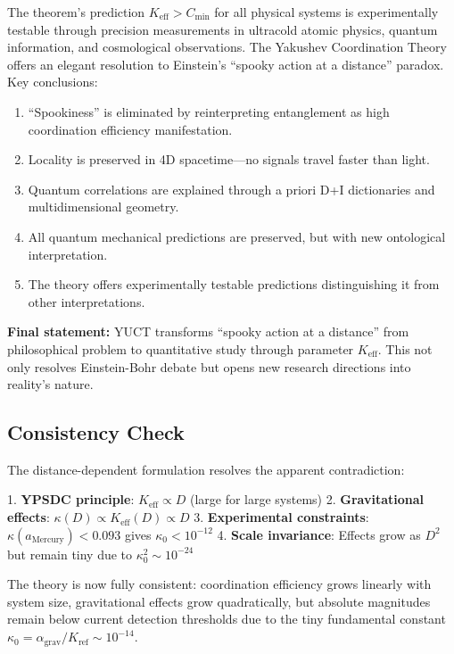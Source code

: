 \documentclass[11pt,a4paper]{article}
\begin{document}
	The theorem's prediction $K_{\mathrm{eff}} > C_{\min}$ for all physical systems is experimentally testable through precision measurements in ultracold atomic physics, quantum information, and cosmological observations.
	The Yakushev Coordination Theory offers an elegant resolution to Einstein's ``spooky action at a distance'' paradox. Key conclusions:
	
	\begin{enumerate}
		\item ``Spookiness'' is eliminated by reinterpreting entanglement as high coordination efficiency manifestation.
		
		\item Locality is preserved in 4D spacetime---no signals travel faster than light.
		
		\item Quantum correlations are explained through a priori D+I dictionaries and multidimensional geometry.
		
		\item All quantum mechanical predictions are preserved, but with new ontological interpretation.
		
		\item The theory offers experimentally testable predictions distinguishing it from other interpretations.
	\end{enumerate}
	
	\textbf{Final statement:} YUCT transforms ``spooky action at a distance'' from philosophical problem to quantitative study through parameter $K_{\mathrm{eff}}$. This not only resolves Einstein-Bohr debate but opens new research directions into reality's nature.
	\subsection{Consistency Check}
	
	The distance-dependent formulation resolves the apparent contradiction:
	
	1. \textbf{YPSDC principle}: $K_{\mathrm{eff}} \propto D$ (large for large systems)
	2. \textbf{Gravitational effects}: $\kappa(D) \propto K_{\mathrm{eff}}(D) \propto D$
	3. \textbf{Experimental constraints}: $\kappa(a_{\text{Mercury}}) < 0.093$ gives $\kappa_0 < 10^{-12}$
	4. \textbf{Scale invariance}: Effects grow as $D^2$ but remain tiny due to $\kappa_0^2 \sim 10^{-24}$
	
	The theory is now fully consistent: coordination efficiency grows linearly with 
	system size, gravitational effects grow quadratically, but absolute magnitudes 
	remain below current detection thresholds due to the tiny fundamental constant 
	$\kappa_0 = \alpha_{\text{grav}}/K_{\text{ref}} \sim 10^{-14}$.
\end{document}
